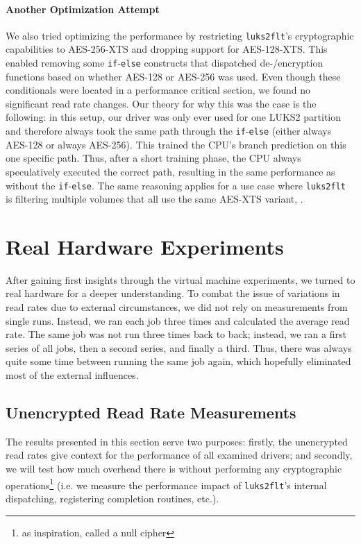 \paragraph{Another Optimization Attempt}
We also tried optimizing the performance by restricting \texttt{luks2flt}'s cryptographic capabilities to AES-256-XTS and dropping support for AES-128-XTS. This enabled removing some \texttt{if}-\texttt{else} constructs that dispatched de-/encryption functions based on whether AES-128 or AES-256 was used. Even though these conditionals were located in a performance critical section, we found no significant read rate changes. Our theory for why this was the case is the following: in this setup, our driver was only ever used for one LUKS2 partition and therefore always took the same path through the \texttt{if}-\texttt{else} (either always AES-128 or always AES-256). This trained the CPU's branch prediction on this one specific path. Thus, after a short training phase, the CPU always speculatively executed the correct path, resulting in the same performance as without the \texttt{if}-\texttt{else}. The same reasoning applies for a use case where \texttt{luks2flt} is filtering multiple volumes that all use the same AES-XTS variant, .

\section{Real Hardware Experiments}
\label{chap:performance.hwexperiments}
After gaining first insights through the virtual machine experiments, we turned to real hardware for a deeper understanding. To combat the issue of variations in read rates due to external circumstances, we did not rely on measurements from single runs. Instead, we ran each job three times and calculated the average read rate. The same job was not run three times back to back; instead, we ran a first series of all jobs, then a second series, and finally a third. Thus, there was always quite some time between running the same job again, which hopefully eliminated most of the external influences.

\subsection{Unencrypted Read Rate Measurements}
\label{chap:performance.hwexperiments.unencrypted}
The results presented in this section serve two purposes: firstly, the unencrypted read rates give context for the performance of all examined drivers; and secondly, we will test how much overhead there is without performing any cryptographic operations\footnote{\label{fn:performance.hwexperiments.nullcryptoinspiration} \cite{Traeger2008} as inspiration, called a null cipher } (i.e. we measure the performance impact of \texttt{luks2flt}'s internal dispatching, registering completion routines, etc.).

